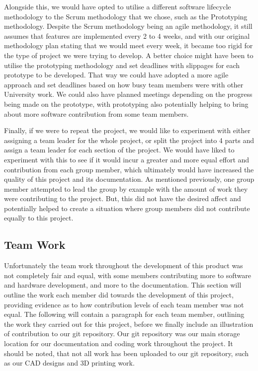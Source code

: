             Alongside this, we would have opted to utilise a different software lifecycle methodology to the Scrum methodology that we chose, such as the Prototyping methodology. Despite the Scrum methodology being an agile methodology, it still assumes that features are implemented every 2 to 4 weeks, and with our original methodology plan stating that we would meet every week, it became too rigid for the type of project we were trying to develop. A better choice might have been to utilise the prototyping methodology and set deadlines with slippages for each prototype to be developed. That way we could have adopted a more agile approach and set deadlines based on how busy team members were with other University work. We could also have planned meetings depending on the progress being made on the prototype, with prototyping also potentially helping to bring about more software contribution from some team members.

            Finally, if we were to repeat the project, we would like to experiment with either assigning a team leader for the whole project, or split the project into 4 parts and assign a team leader for each section of the project. We would have liked to experiment with this to see if it would incur a greater and more equal effort and contribution from each group member, which ultimately would have increased the quality of this project and its documentation. As mentioned previously, one group member attempted to lead the group by example with the amount of work they were contributing to the project. But, this did not have the desired affect and potentially helped to create a situation where group members did not contribute equally to this project.

        \subsection{Team Work}

            Unfortunately the team work throughout the development of this product was not completely fair and equal, with some members contributing more to software and hardware development, and more to the documentation. This section will outline the work each member did towards the development of this project, providing evidence as to how contribution levels of each team member was not equal. The following will contain a paragraph for each team member, outlining the work they carried out for this project, before we finally include an illustration of contribution to our git repository. Our git repository was our main storage location for our documentation and coding work throughout the project. It should be noted, that not all work has been uploaded to our git repository, such as our CAD designs and 3D printing work.

